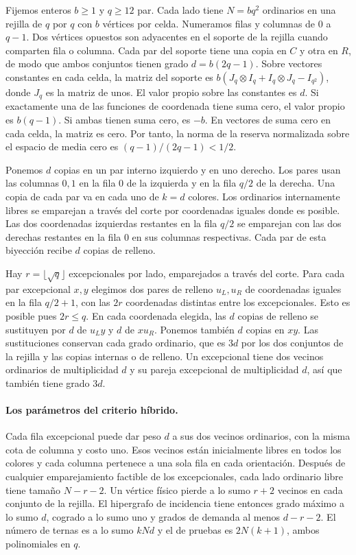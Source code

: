 Fijemos enteros \(b\ge1\) y \(q\ge12\) par. Cada lado tiene \(N=bq^2\) ordinarios en una rejilla de \(q\) por \(q\) con \(b\) vértices por celda. Numeramos filas y columnas de \(0\) a \(q-1\). Dos vértices opuestos son adyacentes en el soporte de la rejilla cuando comparten fila o columna. Cada par del soporte tiene una copia en \(C\) y otra en \(R\), de modo que ambos conjuntos tienen grado \(d=b(2q-1)\). Sobre vectores constantes en cada celda, la matriz del soporte es \(b(J_q\otimes I_q+I_q\otimes J_q-I_{q^2})\), donde \(J_q\) es la matriz de unos. El valor propio sobre las constantes es \(d\). Si exactamente una de las funciones de coordenada tiene suma cero, el valor propio es \(b(q-1)\). Si ambas tienen suma cero, es \(-b\). En vectores de suma cero en cada celda, la matriz es cero. Por tanto, la norma de la reserva normalizada sobre el espacio de media cero es \((q-1)/(2q-1)<1/2\).

Ponemos \(d\) copias en un par interno izquierdo y en uno derecho. Los pares usan las columnas \(0,1\) en la fila \(0\) de la izquierda y en la fila \(q/2\) de la derecha. Una copia de cada par va en cada uno de \(k=d\) colores. Los ordinarios internamente libres se emparejan a través del corte por coordenadas iguales donde es posible. Las dos coordenadas izquierdas restantes en la fila \(q/2\) se emparejan con las dos derechas restantes en la fila \(0\) en sus columnas respectivas. Cada par de esta biyección recibe \(d\) copias de relleno.

Hay \(r=\lfloor\sqrt q\rfloor\) excepcionales por lado, emparejados a través del corte. Para cada par excepcional \(x,y\) elegimos dos pares de relleno \(u_L,u_R\) de coordenadas iguales en la fila \(q/2+1\), con las \(2r\) coordenadas distintas entre los excepcionales. Esto es posible pues \(2r\le q\). En cada coordenada elegida, las \(d\) copias de relleno se sustituyen por \(d\) de \(u_Ly\) y \(d\) de \(xu_R\). Ponemos también \(d\) copias en \(xy\). Las sustituciones conservan cada grado ordinario, que es \(3d\) por los dos conjuntos de la rejilla y las copias internas o de relleno. Un excepcional tiene dos vecinos ordinarios de multiplicidad \(d\) y su pareja excepcional de multiplicidad \(d\), así que también tiene grado \(3d\).

\paragraph{Los parámetros del criterio híbrido.}
Cada fila excepcional puede dar peso \(d\) a sus dos vecinos ordinarios, con la misma cota de columna y costo uno. Esos vecinos están inicialmente libres en todos los colores y cada columna pertenece a una sola fila en cada orientación. Después de cualquier emparejamiento factible de los excepcionales, cada lado ordinario libre tiene tamaño \(N-r-2\). Un vértice físico pierde a lo sumo \(r+2\) vecinos en cada conjunto de la rejilla. El hipergrafo de incidencia tiene entonces grado máximo a lo sumo \(d\), cogrado a lo sumo uno y grados de demanda al menos \(d-r-2\). El número de ternas es a lo sumo \(kNd\) y el de pruebas es \(2N(k+1)\), ambos polinomiales en \(q\).

